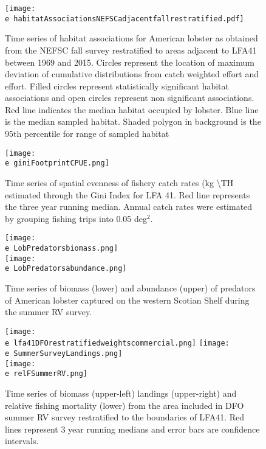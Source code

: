 \documentclass[11pt]{article}
\newcommand{\e}{/backup/bio_data/bio.lobster/figures/} %
\begin{document}
\begin{figure}

    \texttt{[image: \\e habitatAssociationsNEFSCadjacentfallrestratified.pdf]}
    \caption{Time series of habitat associations for American lobster as obtained from the NEFSC fall survey  restratified to areas adjacent to LFA41 between 1969 and 2015. Circles represent the location of maximum deviation of cumulative distributions from catch weighted effort and effort. Filled circles represent statistically significant habitat associations and open circles represent non significant associations. Red line indicates
the median habitat occupied by lobster. Blue line is the median sampled habitat. Shaded polygon in background is the 95th percentile for range of sampled habitat}

\end{figure}



\begin{figure}

    \texttt{[image: \\e giniFootprintCPUE.png]}
    \caption{Time series of spatial evenness of fishery catch rates (kg \textbackslash TH estimated through the Gini Index for LFA 41. Red line represents the three year running median. Annual catch rates were estimated by grouping fishing trips into 0.05 deg$^2$.}

\end{figure}




\begin{figure}

    \texttt{[image: \\e LobPredatorsbiomass.png]}\\
    \texttt{[image: \\e LobPredatorsabundance.png]}\\
    \caption{Time series of biomass (lower) and abundance (upper) of predators of American lobster captured on the western Scotian Shelf during the summer RV survey.}

\end{figure}



\begin{figure}

    \texttt{[image: \\e lfa41DFOrestratifiedweightscommercial.png]}
    \texttt{[image: \\e SummerSurveyLandings.png]} \\
    \texttt{[image: \\e relFSummerRV.png]} \\
    \caption{Time series of biomass (upper-left) landings (upper-right) and relative fishing mortality (lower) from the area included in DFO summer RV survey restratified to the boundaries of LFA41. Red lines represent 3 year running medians and error bars are confidence intervals.}

\end{figure}
\end{document}
